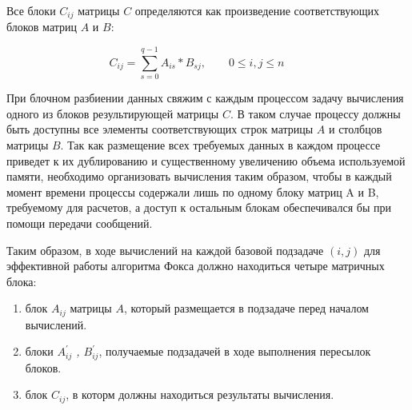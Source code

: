 \documentclass{report}
\begin{document}
Все блоки $C_{ij}$ матрицы {\itshape $C$} определяются как произведение соответствующих блоков матриц {\itshape $A$} и {\itshape $B$}:
\par$$
    C_{ij} = \sum_{s=0}^{q-1} A_{is} * B_{sj},\qquad 0 \le i,j \le n \qquad
    $$
\par При блочном разбиении данных  свяжим с каждым процессом задачу вычисления одного из блоков результирующей матрицы {\itshape $C$}. В таком случае процессу должны быть доступны все элементы соответствующих строк матрицы {\itshape $A$} и столбцов матрицы {\itshape $B$}. Так как размещение всех требуемых данных в каждом процессе приведет к их дублированию и существенному увеличению объема используемой памяти, необходимо организовать вычисления таким образом, чтобы в каждый момент времени процессы содержали лишь по одному блоку матриц A и B, требуемому для расчетов, а доступ к остальным блокам обеспечивался бы при помощи передачи сообщений.
\par Таким образом, в ходе вычислений на каждой базовой подзадаче {\itshape $(i,j)$} для эффективной работы алгоритма Фокса должно находиться четыре матричных блока:
\begin{enumerate} 
  \item блок {\itshape $A_{ij}$} матрицы {\itshape $A$}, который размещается в подзадаче перед началом вычислений.
  \item блоки {\itshape $A_{ij}^{'}$ , $B_{ij}^{'}$}, получаемые подзадачей в ходе выполнения пересылок блоков.
  \item блок {\itshape $C_{ij}$}, в которм должны находиться результаты вычисления.
\end{enumerate}
\newpage

\end{document}
